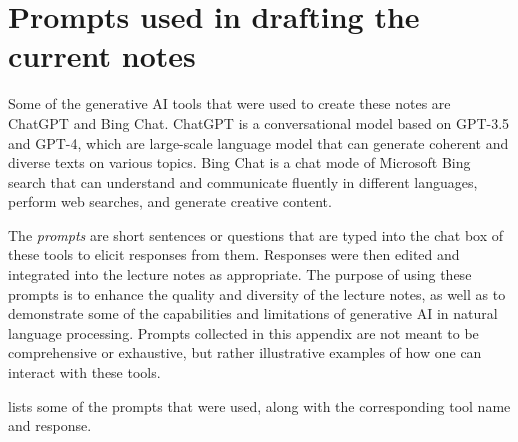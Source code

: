 \documentclass[11pt, a4paper]{amsart}
\newcommand{\generatedtext}[1]{\colorbox{light-gray}{{#1}}} %
\begin{document}
\newpage
\printbibliography


\newpage
\appendix


\section{Prompts used in drafting the current notes}
\label{appendix:prompts}

Some of the generative AI tools that were used to create these notes are ChatGPT and Bing Chat.
ChatGPT is a conversational model based on GPT-3.5 and GPT-4, which are large-scale language model that can generate coherent and diverse texts on various topics.
Bing Chat is a chat mode of Microsoft Bing search that can understand and communicate fluently in different languages, perform web searches, and generate creative content.

The \emph{prompts} are short sentences or questions that are typed into the chat box of these tools to elicit responses from them. 
Responses were then edited and integrated into the lecture notes as appropriate. 
The purpose of using these prompts is to enhance the quality and diversity of the lecture notes, as well as to demonstrate some of the capabilities and limitations of generative AI in natural language processing.
Prompts collected in this appendix are not meant to be comprehensive or exhaustive, but rather illustrative examples of how one can interact with these tools.

 lists some of the prompts that were used, along with the corresponding tool name and response.
\end{document}
